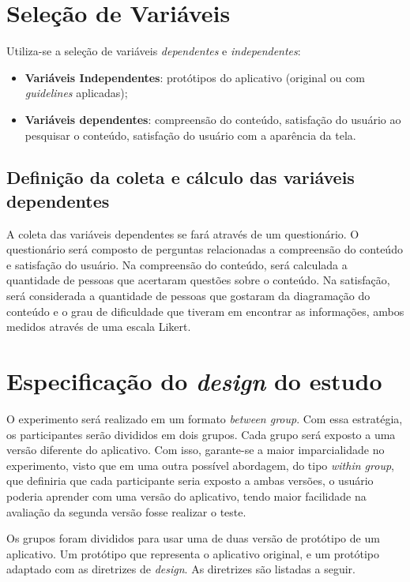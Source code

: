\documentclass[12pt]{article}
\begin{document}
\section{Seleção de Variáveis}

Utiliza-se a seleção de variáveis \textit{dependentes} e \textit{independentes}:

\begin{itemize}
	\item \textbf{Variáveis Independentes}: protótipos do aplicativo (original ou com \textit{guidelines} aplicadas); 
	\item \textbf{Variáveis dependentes}: compreensão do conteúdo, satisfação do usuário ao pesquisar o conteúdo, satisfação do usuário com a aparência da tela.
\end{itemize}

\subsection{Definição da coleta e cálculo das variáveis dependentes}

A coleta das variáveis dependentes se fará através de um questionário. O questionário será composto de perguntas relacionadas a compreensão do conteúdo e satisfação do usuário. Na compreensão do conteúdo, será calculada a quantidade de pessoas que acertaram questões sobre o conteúdo. Na satisfação, será considerada a quantidade de pessoas que gostaram da diagramação do conteúdo e o grau de dificuldade que tiveram em encontrar as informações, ambos medidos através de uma escala Likert.

\section{Especificação do \textit{design} do estudo}

O experimento será realizado em um formato \textit{between group}. Com essa estratégia, os participantes serão divididos em dois grupos. Cada grupo será exposto a uma versão diferente do aplicativo. Com isso, garante-se a maior imparcialidade no experimento, visto que em uma outra possível abordagem, do tipo \textit{within group}, que definiria que cada participante seria exposto a ambas versões, o usuário poderia aprender com uma versão do aplicativo, tendo maior facilidade na avaliação da segunda versão fosse realizar o teste.

Os grupos foram divididos para usar uma de duas versão de protótipo de um aplicativo. Um protótipo que representa o aplicativo original, e um protótipo adaptado com as diretrizes de \textit{design}. As diretrizes são listadas a seguir.
\end{document}
